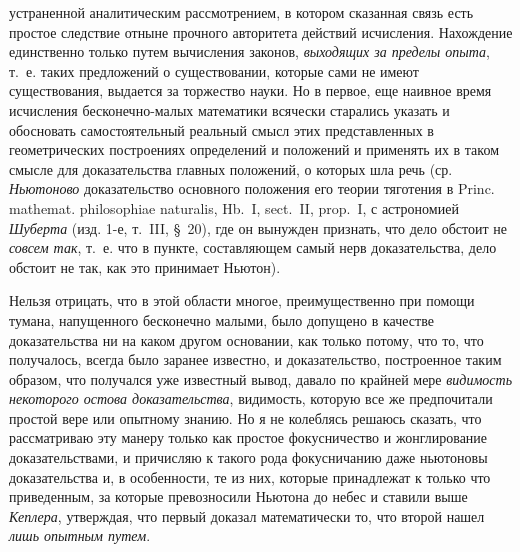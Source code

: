 устраненной аналитическим рассмотрением, в котором сказанная связь есть
простое следствие отныне прочного авторитета действий исчисления.
Нахождение единственно только путем вычисления законов,
{\em выходящих за пределы опыта}, т.~е. таких
предложений о существовании, которые сами не имеют существования, выдается
за торжество науки. Но в первое, еще наивное время исчисления
бесконечно-малых математики всячески старались указать и обосновать
самостоятельный реальный смысл этих представленных в геометрических
построениях определений и положений и применять их в таком смысле для
доказательства главных положений, о которых шла речь (ср.
{\em Ньютоново} доказательство основного положения его
теории тяготения в Princ. mathemat. philosophiae naturalis, Hb.~I,
sect.~II, prop.~I, с астрономией {\em Шуберта} (изд. 1-е, т.~III, \S~20),
где он вынужден признать, что дело обстоит не
{\em совсем так}, т.~е. что в пункте, составляющем
самый нерв доказательства, дело обстоит не так, как это принимает Ньютон).

Нельзя отрицать, что в этой области многое, преимущественно при помощи
тумана, напущенного бесконечно малыми, было допущено в качестве
доказательства ни на каком другом основании, как только потому, что то, что
получалось, всегда было заранее известно, и доказательство, построенное
таким образом, что получался уже известный вывод, давало по крайней мере
{\em видимость некоторого остова доказательства},
видимость, которую все же предпочитали простой вере или опытному знанию. Но
я не колеблясь решаюсь сказать, что рассматриваю эту манеру только как
простое фокусничество и жонглирование доказательствами, и причисляю к
такого рода фокусничанию даже ньютоновы доказательства и, в особенности, те
из них, которые принадлежат к только что приведенным, за которые
превозносили Ньютона до небес и ставили выше
{\em Кеплера}, утверждая, что первый доказал
математически то, что второй нашел {\em лишь опытным путем}.

